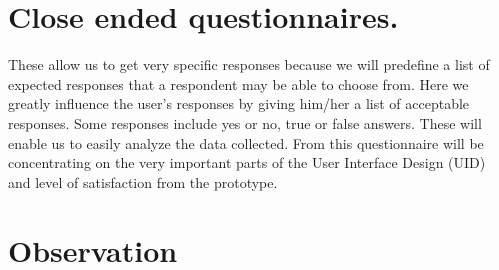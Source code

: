 \documentclass{article}
\begin{document}
\section{Close ended questionnaires.} 
{These allow us to get very specific responses because we will predefine a list of expected responses that a respondent may be able to choose from. Here we greatly influence the user’s responses by giving him/her a list of acceptable responses. Some responses include yes or no, true or false answers. These will enable us to easily analyze the data collected. From this questionnaire will be concentrating on the very important parts of the User Interface Design (UID) and level of satisfaction from the prototype.}
\section{Observation}
\end{document}
